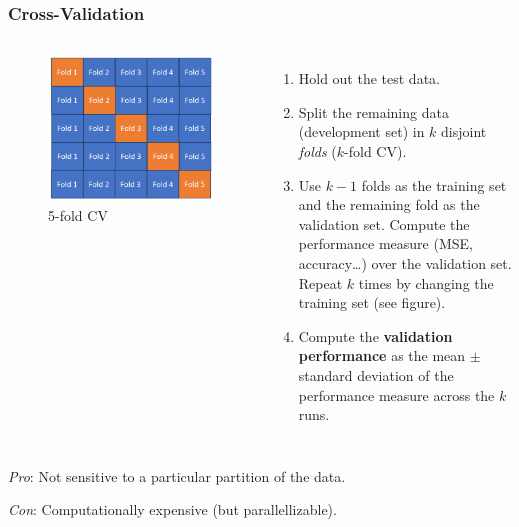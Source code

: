 \documentclass{beamer}
\begin{document}
	\begin{frame}
		\frametitle{Cross-Validation}
		\begin{columns}
			\begin{figure}
				\centering
				\includegraphics[scale=0.4]{images/cross-validation}
				\caption{5-fold CV}
			\end{figure}
			\begin{enumerate}
				\small
				\item Hold out the test data.
				\item Split the remaining data (development set) in $k$ disjoint \textit{folds} ($k$-fold CV).
				\item Use $k-1$ folds as the training set and the remaining fold as the validation set. Compute the performance measure (MSE, accuracy\dots) over the validation set. Repeat $k$ times by changing the training set (see figure). 
				\item Compute the \textbf{validation performance} as the mean $\pm$ standard deviation of the performance measure across the $k$ runs.
			\end{enumerate}
		\end{columns}
		
		\vspace{5mm}
		
		\textit{Pro}: Not sensitive to a particular partition of the data.
		
		\textit{Con}: Computationally expensive (but parallellizable).
		
	\end{frame}
\end{document}
